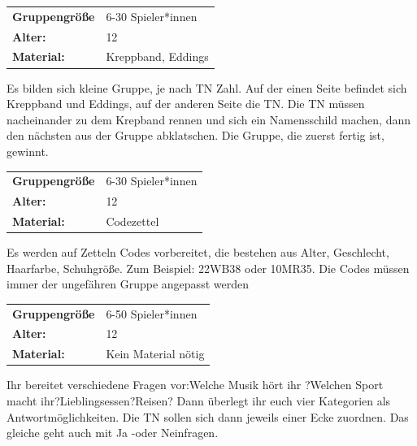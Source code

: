\newpage
\begin{table}[H]
\begin{tabular}{>{\bfseries}lp{8cm}}
   Gruppengröße   & 6-30 Spieler*innen\\
    Alter: & 12 \\
    Material: & Kreppband, Eddings \\
\end{tabular}
\end{table} 

Es bilden sich kleine Gruppe, je nach TN Zahl.  Auf der einen Seite befindet sich Kreppband und Eddings, auf der anderen Seite die TN. Die TN müssen nacheinander zu dem Krepband rennen und sich ein Namensschild machen, dann den nächsten aus der Gruppe abklatschen. Die Gruppe, die zuerst fertig ist, gewinnt.\\



\begin{tabularx}{\textwidth}{>{\bfseries}lX}
   Gruppengröße   & 6-30 Spieler*innen\\
    Alter: & 12 \\
    Material: & Codezettel\\ \end{tabularx}
Es werden auf Zetteln Codes vorbereitet, die bestehen aus Alter, Geschlecht, Haarfarbe, Schuhgröße. Zum Beispiel: 22WB38 oder 10MR35. Die Codes müssen immer der ungefähren Gruppe angepasst werden\\



\begin{tabularx}{\textwidth}{>{\bfseries}lX}
   Gruppengröße   & 6-50 Spieler*innen\\
    Alter: & 12 \\
    Material: & Kein Material nötig \\ \end{tabularx}
Ihr bereitet verschiedene Fragen vor:Welche Musik hört ihr ?Welchen Sport macht ihr?Lieblingsessen?Reisen? Dann überlegt ihr euch vier Kategorien als Antwortmöglichkeiten. Die TN sollen sich dann jeweils einer Ecke zuordnen. Das gleiche geht auch mit Ja -oder Neinfragen. \\



